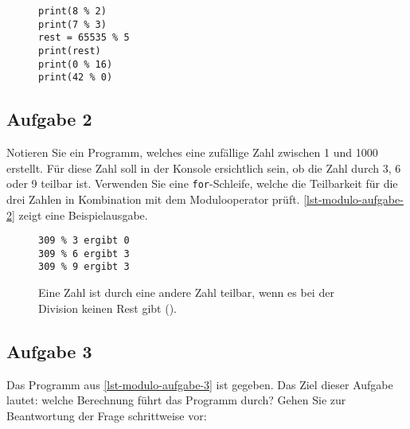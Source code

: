 \begin{figure}[htb]
\begin{minipage}{0.45\textwidth}
\fillwithgrid{1.5in}
\end{minipage}
\hfill
\begin{minipage}{0.45\textwidth}
\begin{lstlisting}[label={lst-modulo-aufgabe-1}, caption={Modulooperationen.}]
print(8 % 2)
print(7 % 3)
rest = 65535 % 5
print(rest)
print(0 % 16)
print(42 % 0)
\end{lstlisting}
\end{minipage}
\end{figure}

\subsection{Aufgabe 2}

Notieren Sie ein Programm, welches eine zufällige Zahl zwischen \num{1} und \num{1000} erstellt. Für diese Zahl soll in der Konsole ersichtlich sein, ob die Zahl durch \num{3}, \num{6} oder \num{9} teilbar ist. Verwenden Sie eine \lstinline{for}-Schleife, welche die Teilbarkeit für die drei Zahlen in Kombination mit dem Modulooperator prüft. \autoref{lst-modulo-aufgabe-2} zeigt eine Beispielausgabe.

\begin{figure}[htb]
\begin{minipage}{0.55\textwidth}
\fillwithgrid{3in}
\end{minipage}
\hfill
\begin{minipage}{0.4\textwidth}
\begin{lstlisting}[label={lst-modulo-aufgabe-2}, caption={Beispielausgabe.}]
309 % 3 ergibt 0
309 % 6 ergibt 3
309 % 9 ergibt 3
\end{lstlisting}
\begin{important}[Teilbarkeit]
Eine Zahl ist durch eine andere Zahl teilbar, wenn es bei der Division keinen Rest gibt ().
\end{important}
\end{minipage}
\end{figure}

\newpage

\subsection{Aufgabe 3}

Das Programm aus \autoref{lst-modulo-aufgabe-3} ist gegeben. Das Ziel dieser Aufgabe lautet: welche Berechnung führt das Programm durch? Gehen Sie zur Beantwortung der Frage schrittweise vor:

